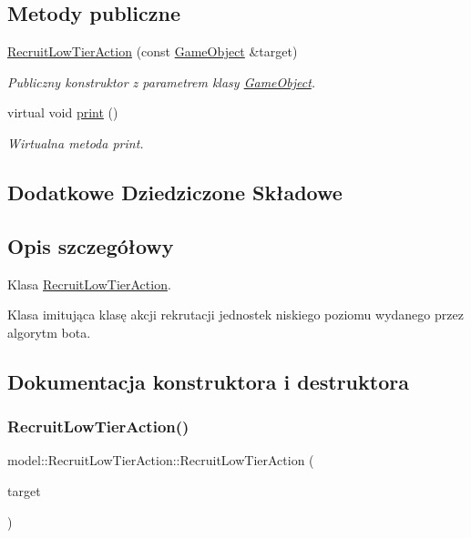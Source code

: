 \subsection*{Metody publiczne}
\begin{DoxyCompactItemize}
\item 
\hyperlink{classmodel_1_1RecruitLowTierAction_a15963b6d250a6a416814ed196443a533}{Recruit\+Low\+Tier\+Action} (const \hyperlink{classmodel_1_1GameObject}{Game\+Object} \&target)
\begin{DoxyCompactList}\small\item\em Publiczny konstruktor z parametrem klasy \hyperlink{classmodel_1_1GameObject}{Game\+Object}. \end{DoxyCompactList}\item 
virtual void \hyperlink{classmodel_1_1RecruitLowTierAction_ac05d2ba4872e6b06bf3a218661a4abdc}{print} ()
\begin{DoxyCompactList}\small\item\em Wirtualna metoda print. \end{DoxyCompactList}\end{DoxyCompactItemize}
\subsection*{Dodatkowe Dziedziczone Składowe}


\subsection{Opis szczegółowy}
Klasa \hyperlink{classmodel_1_1RecruitLowTierAction}{Recruit\+Low\+Tier\+Action}. 

Klasa imitująca klasę akcji rekrutacji jednostek niskiego poziomu wydanego przez algorytm bota. 

\subsection{Dokumentacja konstruktora i destruktora}
\mbox{\label{classmodel_1_1RecruitLowTierAction_a15963b6d250a6a416814ed196443a533}} 
\subsubsection{\texorpdfstring{Recruit\+Low\+Tier\+Action()}{RecruitLowTierAction()}}
{\footnotesize\ttfamily model\+::\+Recruit\+Low\+Tier\+Action\+::\+Recruit\+Low\+Tier\+Action (\begin{DoxyParamCaption}\item[{const \hyperlink{classmodel_1_1GameObject}{Game\+Object} \&}]{target }\end{DoxyParamCaption})\hspace{0.3cm}{\ttfamily [inline]}}



